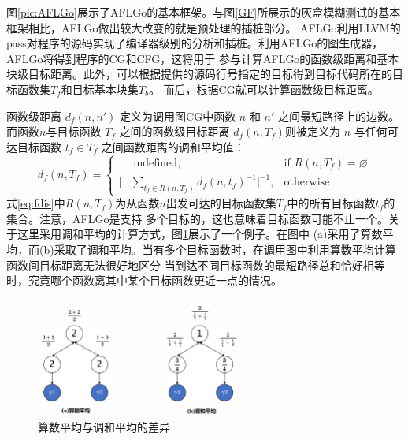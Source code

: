 \documentclass[bachelor]{njupthesis}
\begin{document}
图\ref{pic:AFLGo}展示了AFLGo的基本框架。与图\ref{GF}所展示的灰盒模糊测试的基本框架相比，AFLGo做出较大改变的就是预处理的插桩部分。
AFLGo利用LLVM的pass\cite{Pass}对程序的源码实现了编译器级别的分析和插桩。利用AFLGo的图生成器，AFLGo将得到程序的CG和CFG，这将用于
参与计算AFLGo的函数级距离和基本块级目标距离。此外，可以根据提供的源码行号指定的目标得到目标代码所在的目标函数集$T_f$和目标基本块集$T_b$。
而后，根据CG就可以计算函数级目标距离。

函数级距离 $d_f(n, n')$ 定义为调用图CG中函数 $n$ 和 $n'$ 之间最短路径上的边数。而函数$n$与目标函数 $T_f$ 
之间的函数级目标距离 $d_f (n,T_f) $则被定义为 $n$ 与任何可达目标函数 $t_f \in T_f$ 之间函数距离的调和平均值：
 \begin{equation}\label{eq:fdis}
	d_f(n,T_f)=\left\{ \begin{aligned}
		&\text{undefined} , &\text{if } R(n,T_f)=\varnothing \\
	   [&\sum\limits_{t_f\in R(n,T_f)} d_f(n,t_f)^{-1}]^{-1} , &\text{otherwise} 
   \end{aligned}
   \right.
 \end{equation}
式\ref{eq:fdis}中$R(n,T_f)$为从函数$n$出发可达的目标函数集$T_f$中的所有目标函数$t_f$的集合。注意，AFLGo是支持
多个目标的，这也意味着目标函数可能不止一个。关于这里采用调和平均的计算方式，图\ref{pic:diff}展示了一个例子。在图中
(a)采用了算数平均，而(b)采取了调和平均。当有多个目标函数时，在调用图中利用算数平均计算函数间目标距离无法很好地区分
当到达不同目标函数的最短路径总和恰好相等时，究竟哪个函数离其中某个目标函数更近一点的情况。

\begin{figure}[htbp]
	\centering
	\includegraphics[width=0.6\textwidth]{pic/diff.pdf}
	\caption{算数平均与调和平均的差异}
 	\label{pic:diff}
\end{figure}
\end{document}
